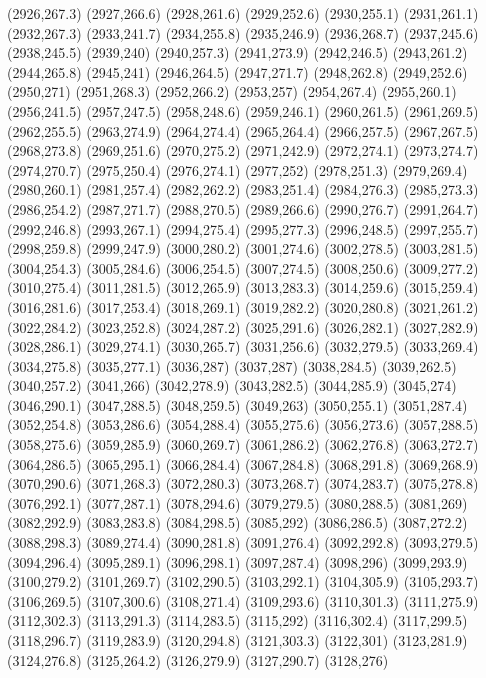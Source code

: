 (2926,267.3)
(2927,266.6)
(2928,261.6)
(2929,252.6)
(2930,255.1)
(2931,261.1)
(2932,267.3)
(2933,241.7)
(2934,255.8)
(2935,246.9)
(2936,268.7)
(2937,245.6)
(2938,245.5)
(2939,240)
(2940,257.3)
(2941,273.9)
(2942,246.5)
(2943,261.2)
(2944,265.8)
(2945,241)
(2946,264.5)
(2947,271.7)
(2948,262.8)
(2949,252.6)
(2950,271)
(2951,268.3)
(2952,266.2)
(2953,257)
(2954,267.4)
(2955,260.1)
(2956,241.5)
(2957,247.5)
(2958,248.6)
(2959,246.1)
(2960,261.5)
(2961,269.5)
(2962,255.5)
(2963,274.9)
(2964,274.4)
(2965,264.4)
(2966,257.5)
(2967,267.5)
(2968,273.8)
(2969,251.6)
(2970,275.2)
(2971,242.9)
(2972,274.1)
(2973,274.7)
(2974,270.7)
(2975,250.4)
(2976,274.1)
(2977,252)
(2978,251.3)
(2979,269.4)
(2980,260.1)
(2981,257.4)
(2982,262.2)
(2983,251.4)
(2984,276.3)
(2985,273.3)
(2986,254.2)
(2987,271.7)
(2988,270.5)
(2989,266.6)
(2990,276.7)
(2991,264.7)
(2992,246.8)
(2993,267.1)
(2994,275.4)
(2995,277.3)
(2996,248.5)
(2997,255.7)
(2998,259.8)
(2999,247.9)
(3000,280.2)
(3001,274.6)
(3002,278.5)
(3003,281.5)
(3004,254.3)
(3005,284.6)
(3006,254.5)
(3007,274.5)
(3008,250.6)
(3009,277.2)
(3010,275.4)
(3011,281.5)
(3012,265.9)
(3013,283.3)
(3014,259.6)
(3015,259.4)
(3016,281.6)
(3017,253.4)
(3018,269.1)
(3019,282.2)
(3020,280.8)
(3021,261.2)
(3022,284.2)
(3023,252.8)
(3024,287.2)
(3025,291.6)
(3026,282.1)
(3027,282.9)
(3028,286.1)
(3029,274.1)
(3030,265.7)
(3031,256.6)
(3032,279.5)
(3033,269.4)
(3034,275.8)
(3035,277.1)
(3036,287)
(3037,287)
(3038,284.5)
(3039,262.5)
(3040,257.2)
(3041,266)
(3042,278.9)
(3043,282.5)
(3044,285.9)
(3045,274)
(3046,290.1)
(3047,288.5)
(3048,259.5)
(3049,263)
(3050,255.1)
(3051,287.4)
(3052,254.8)
(3053,286.6)
(3054,288.4)
(3055,275.6)
(3056,273.6)
(3057,288.5)
(3058,275.6)
(3059,285.9)
(3060,269.7)
(3061,286.2)
(3062,276.8)
(3063,272.7)
(3064,286.5)
(3065,295.1)
(3066,284.4)
(3067,284.8)
(3068,291.8)
(3069,268.9)
(3070,290.6)
(3071,268.3)
(3072,280.3)
(3073,268.7)
(3074,283.7)
(3075,278.8)
(3076,292.1)
(3077,287.1)
(3078,294.6)
(3079,279.5)
(3080,288.5)
(3081,269)
(3082,292.9)
(3083,283.8)
(3084,298.5)
(3085,292)
(3086,286.5)
(3087,272.2)
(3088,298.3)
(3089,274.4)
(3090,281.8)
(3091,276.4)
(3092,292.8)
(3093,279.5)
(3094,296.4)
(3095,289.1)
(3096,298.1)
(3097,287.4)
(3098,296)
(3099,293.9)
(3100,279.2)
(3101,269.7)
(3102,290.5)
(3103,292.1)
(3104,305.9)
(3105,293.7)
(3106,269.5)
(3107,300.6)
(3108,271.4)
(3109,293.6)
(3110,301.3)
(3111,275.9)
(3112,302.3)
(3113,291.3)
(3114,283.5)
(3115,292)
(3116,302.4)
(3117,299.5)
(3118,296.7)
(3119,283.9)
(3120,294.8)
(3121,303.3)
(3122,301)
(3123,281.9)
(3124,276.8)
(3125,264.2)
(3126,279.9)
(3127,290.7)
(3128,276)
